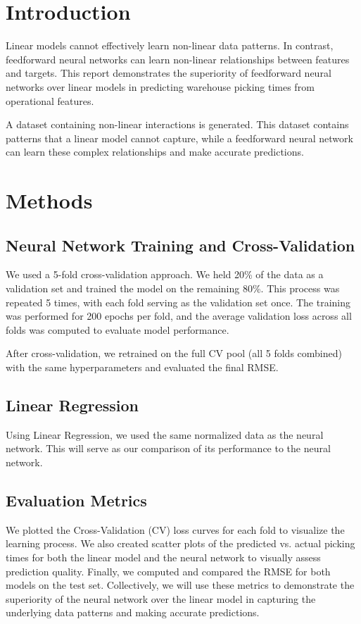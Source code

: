 \documentclass[10pt,twocolumn]{article}
\begin{document}

\section{Introduction} 
\label{sec:introduction}

Linear models cannot effectively learn non-linear data patterns. In contrast, feedforward neural networks can learn non-linear relationships between features and targets. This report demonstrates the superiority of feedforward neural networks over linear models in predicting warehouse picking times from operational features. 

A dataset containing non-linear interactions is generated. This dataset contains patterns that a linear model cannot capture, while a feedforward neural network can learn these complex relationships and make accurate predictions.

\section{Methods}

\subsection{Neural Network Training and Cross-Validation}
We used a 5-fold cross-validation approach. We held 20\% of the data as a validation set and trained the model on the remaining 80\%. This process was repeated 5 times, with each fold serving as the validation set once. The training was performed for 200 epochs per fold, and the average validation loss across all folds was computed to evaluate model performance.

After cross-validation, we retrained on the full CV pool (all 5 folds combined) with the same hyperparameters and evaluated the final RMSE.

\subsection{Linear Regression}
Using Linear Regression, we used the same normalized data as the neural network. This will serve as our comparison of its performance to the neural network.

\subsection{Evaluation Metrics}
We plotted the Cross-Validation (CV) loss curves for each fold to visualize the learning process. 
We also created scatter plots of the predicted vs. actual picking times for both the linear model and the neural network to visually assess prediction quality. 
Finally, we computed and compared the RMSE for both models on the test set.
Collectively, we will use these metrics to demonstrate the superiority of the neural network over the linear model in capturing the underlying data patterns and making accurate predictions.
\end{document}

